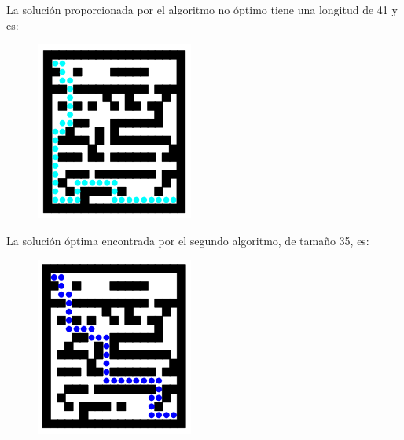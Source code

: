 \documentclass[11pt,a4paper]{article}
\begin{document}
\newpage

		\par
		La solución proporcionada por el algoritmo no óptimo tiene una longitud de 41 y es:

		\vspace{5mm}

		\begin{figure}[h]

			\centering
			\includegraphics[width=0.46\textwidth]{NoOptSolution.png}
			
		\end{figure}

		\par
		La solución óptima encontrada por el segundo algoritmo, de tamaño 35, es:

		\vspace{5mm}

		\begin{figure}[h]

			\centering
			\includegraphics[width=0.46\textwidth]{OptSolutionBlue.png}
			
		\end{figure}

\newpage
\end{document}
